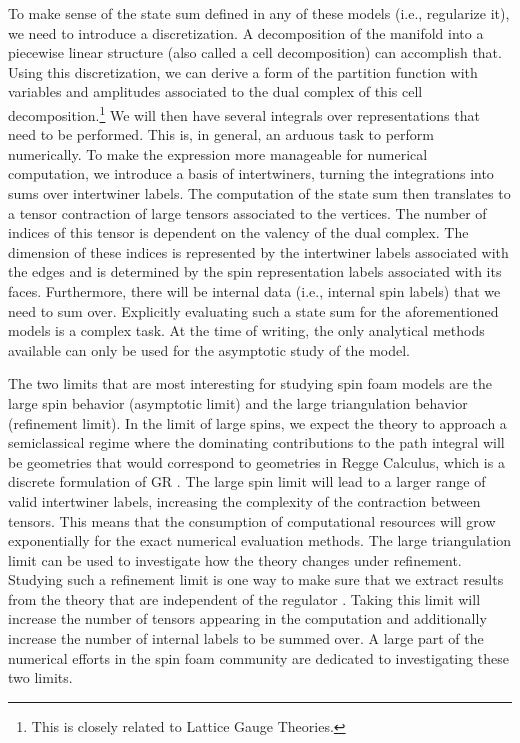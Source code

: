 To make sense of the state sum defined in any of these models (i.e., regularize
it), we need to introduce a discretization. A decomposition of the manifold
into a piecewise linear structure (also called a cell decomposition) can
accomplish that. Using this discretization, we can derive a form of the
partition function with variables and amplitudes associated to the dual complex
of this cell decomposition.\footnote{This is closely related to Lattice Gauge
Theories.} We will then have several integrals over representations that need
to be performed. This is, in general, an arduous task to perform numerically.
To make the expression more manageable for numerical computation, we introduce
a basis of intertwiners, turning the integrations into sums over intertwiner
labels. The computation of the state sum then translates to a tensor
contraction of large tensors associated to the vertices. The number of indices
of this tensor is dependent on the valency of the dual complex. The dimension
of these indices is represented by the intertwiner labels associated with the
edges and is determined by the spin representation labels associated with its
faces. Furthermore, there will be internal data (i.e., internal spin labels)
that we need to sum over. Explicitly evaluating such a state sum for the
aforementioned models is a complex task. At the time of writing, the only
analytical methods available can only be used for the asymptotic study of the
model.

The two limits that are most interesting for studying spin foam models are the
large spin behavior (asymptotic limit) and the large triangulation behavior
(refinement limit). In the limit of large spins, we expect the theory to
approach a semiclassical regime where the dominating contributions to the path
integral will be geometries that would correspond to geometries in Regge
Calculus, which is a discrete formulation of GR
\cite{mikovicEffectiveActionSemiclassical2011}. The large spin limit will lead
to a larger range of valid intertwiner labels, increasing the complexity of the
contraction between tensors. This means that the consumption of computational
resources will grow exponentially for the exact numerical evaluation methods.
The large triangulation limit can be used to investigate how the theory changes
under refinement. Studying such a refinement limit is one way to make sure that
we extract results from the theory that are independent of the regulator
\cite{asanteSpinFoamsRefinement2023}. Taking this limit will increase the
number of tensors appearing in the computation and additionally increase the
number of internal labels to be summed over. A large part of the numerical
efforts in the spin foam community are dedicated to investigating these two
limits.

